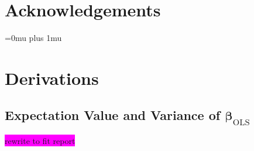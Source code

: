 \documentclass[aps,pra,english,notitlepage,reprint,nofootinbib]{revtex4-1}  %
\begin{document}
\section*{Acknowledgements}\label{sec:cknowledgements}

\Urlmuskip=0mu plus 1mu\relax
\onecolumngrid


\newpage
\appendix
\section{Derivations}\label{appsec:derivations}
\subsection{Expectation Value and Variance of \texorpdfstring{$\boldsymbol{\beta}_\text{OLS}$}{Lg}}\label{subapp:beta OLS}
\colorbox{magenta}{rewrite to fit report}
\end{document}
